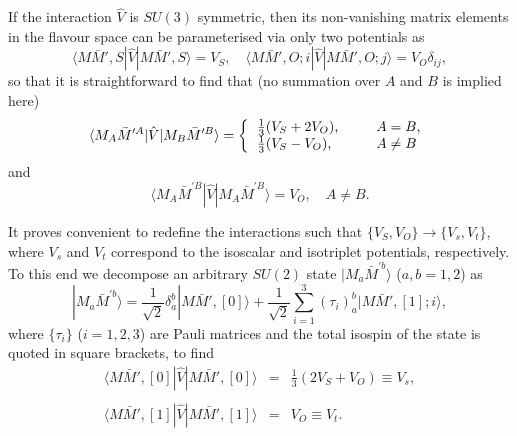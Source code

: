 \documentclass[preprint,12pt,3p]{elsarticle}
\newcommand{\be}{\begin{equation}}
\newcommand{\ee}{\end{equation}}
\newcommand{\bea}{\begin{eqnarray}}
\newcommand{\eea}{\end{eqnarray}}
\begin{document}
If the interaction $\hat{V}$ is $SU(3)$ symmetric, then its
non-vanishing matrix elements in the flavour space can be parameterised via only two potentials as 
\be
\langle M\bar{M}',S|\hat{V}|M\bar{M}',S\rangle=V_S,\quad
\langle M\bar{M}',O;i|\hat{V}|M\bar{M}',O;j\rangle=V_O\delta_{ij},
\label{hatV}
\ee
so that it is straightforward to find that (no summation over $A$ and $B$ is implied here) 
\be
\langle M_A\bar{M}^{\prime A}|\hat{V}|M_B\bar{M}^{\prime B}\rangle=
\left\{
\begin{tabular}{lll}
$\frac13(V_S+2V_O)$,&~~& $A=B$,\\
$\frac13(V_S-V_O)$,&~~& $A\neq B$
\end{tabular}
\right.
\label{matrelem1}
\ee
and
\be
\langle M_A\bar{M}^{\prime B}|\hat{V}|M_A\bar{M}^{\prime B}\rangle=V_O,\quad A\neq B.
\label{matrelem2}
\ee

It proves convenient to redefine the interactions such that $\{V_S,V_O\}\to\{V_s,V_t\}$, where $V_s$ and $V_t$ correspond to the isoscalar and isotriplet potentials, respectively. To this end we decompose an arbitrary $SU(2)$ state $|M_a\bar{M}^{\prime b}\rangle$ ($a,b=1,2$) as 
\be
|M_a\bar{M}^{\prime b}\rangle=\frac{1}{\sqrt{2}}\delta_a^b|M\bar{M}',[0]\rangle+\frac{1}{\sqrt{2}}\sum_{i=1}^3\left(\tau_i\right)_a^b|M\bar{M}',[1];i\rangle,
\ee
where $\{\tau_i\}$ ($i=1,2,3$) are Pauli matrices and the total isospin of the state is quoted in square brackets, to find 
\bea
\langle M\bar{M}',[0]|\hat{V}|M\bar{M}',[0]\rangle&=&\frac13(2V_S+V_O)\equiv V_s,\nonumber\\[-2mm]
\label{su3pot1}\\[-2mm]
\langle M\bar{M}',[1]|\hat{V}|M\bar{M}',[1]\rangle&=&V_O\equiv V_t.\nonumber
\eea
\end{document}
